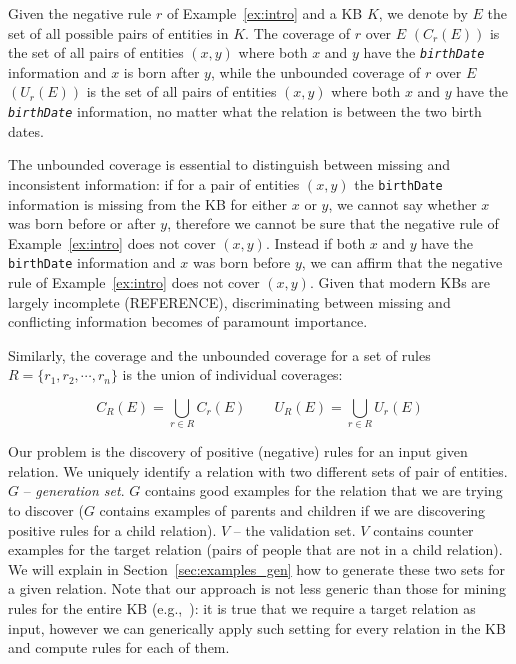 \begin{myExample}
	Given the negative rule $r$ of Example~\ref{ex:intro} and a KB $K$, we denote by $E$ the set of all possible pairs of entities in $K$. The coverage of $r$ over $E$ $(C_r(E))$ is the set of all pairs of entities $(x,y)$ where both $x$ and $y$ have the \emph{\texttt{birthDate}} information and $x$ is born after $y$, while the unbounded coverage of $r$ over $E$ $(U_r(E))$ is the set of all pairs of entities $(x,y)$ where both $x$ and $y$ have the \emph{\texttt{birthDate}} information, no matter what the relation is between the two birth dates. 
\end{myExample}

The unbounded coverage is essential to distinguish between missing and inconsistent information: if for a pair of entities $(x,y)$ the \texttt{birthDate} information is missing from the KB for either $x$ or $y$, we cannot say whether $x$ was born before or after $y$, therefore we cannot be sure that the negative rule of Example~\ref{ex:intro} does not cover $(x,y)$. Instead if both $x$ and $y$ have the \texttt{birthDate} information and $x$ was born before $y$, we can affirm that the negative rule of Example~\ref{ex:intro} does not cover $(x,y)$. Given that modern KBs are largely incomplete (REFERENCE), discriminating between missing and conflicting information becomes of paramount importance.

Similarly, the coverage and the unbounded coverage for a set of rules $R=\{r_1,r_2,\cdots,r_n\}$ is the union of individual coverages:

$$C_R(E) = \bigcup \limits_{r \in R} C_r(E) \qquad U_R(E) = \bigcup \limits_{r \in R} U_r(E) $$

Our problem is the discovery of positive (negative) rules for an input given relation. We uniquely identify a relation with two different sets of pair of entities.
	$G$ -- \emph{generation set}. $G$ contains good examples for the relation that we are trying to discover ($G$ contains examples of parents and children if we are discovering positive rules for a child relation).
	$V$ -- the validation set. $V$ contains counter examples for the target relation (pairs of people that are not in a child relation).
We will explain in Section~\ref{sec:examples_gen} how to generate these two sets for a given relation.
Note that our approach is not less generic than those for mining rules for the entire KB (e.g.,~\cite{abedjan2014amending,galarraga2015fast}): it is true that we require a target relation as input, however we can generically apply such setting for every relation in the KB and compute rules for each of them.



